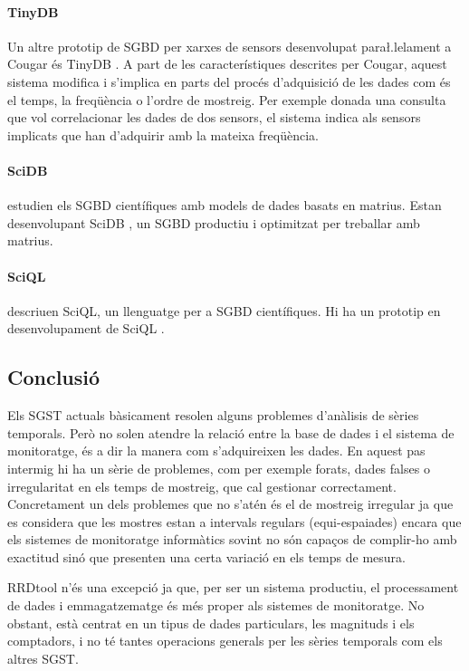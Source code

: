 \paragraph{TinyDB} Un altre prototip de SGBD per xarxes de sensors desenvolupat para\l.lelament a Cougar és TinyDB \parencite{tinyDB}. A part de les característiques descrites per Cougar, aquest sistema  modifica i s'implica en parts del procés d'adquisició de les dades com és el temps, la freqüència o l'ordre de mostreig. Per exemple donada una consulta que vol correlacionar les dades de dos sensors, el sistema indica als sensors implicats que han d'adquirir amb la mateixa freqüència.

\paragraph{SciDB} \textcite{stonebraker09:scidb} estudien els SGBD científiques amb models  de dades basats en matrius. Estan desenvolupant SciDB \parencite{scidb}, un SGBD productiu i optimitzat per treballar amb matrius.


\paragraph{SciQL} \textcite{kersten11} descriuen SciQL, un llenguatge per a SGBD científiques. Hi ha un prototip en desenvolupament de SciQL \parencite{sciql}.





\subsection{Conclusió}

Els SGST actuals bàsicament resolen alguns problemes d'anàlisis de sèries temporals.
Però no solen atendre la relació entre la base de dades i el sistema de monitoratge, és a dir la manera com s'adquireixen les dades. En aquest pas intermig hi ha un sèrie de problemes, com per exemple forats, dades falses o irregularitat en els temps de mostreig, que cal gestionar correctament. Concretament un dels problemes que no s'atén és el de mostreig irregular ja que es considera que les mostres estan a intervals regulars (equi-espaiades) encara que els sistemes de monitoratge informàtics sovint no són capaços de complir-ho amb exactitud sinó que presenten una certa variació en els temps de mesura. 

RRDtool n'és una excepció ja que, per ser un sistema productiu, el processament de dades i emmagatzematge és més proper als sistemes de monitoratge. No obstant, està centrat en un tipus de dades particulars, les magnituds i els comptadors, i no té tantes operacions generals per les sèries temporals com els altres SGST.

